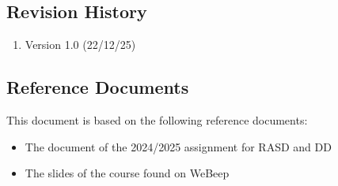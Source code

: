 
\subsection{Revision History}
\begin{enumerate}
    \item Version 1.0 (22/12/25)
\end{enumerate}

\subsection{Reference Documents}
    This document is based on the following reference documents:
    \begin{itemize}
        \item {The document of the 2024/2025 assignment for RASD and DD }
        \item {The slides of the course found on WeBeep}
    \end{itemize}


